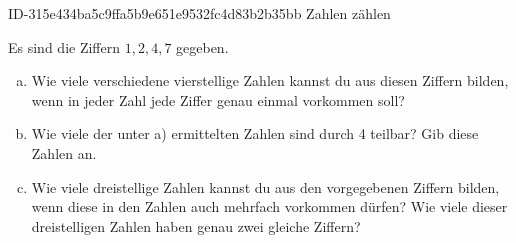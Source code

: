 \begin{exercise}
      {ID-315e434ba5c9ffa5b9e651e9532fc4d83b2b35bb}
      {Zahlen zählen}
  \ifproblem\problem\par
    Es sind die Ziffern $1,2,4,7$ gegeben.
    \begin{enumerate}[a)]
      \item Wie viele verschiedene vierstellige Zahlen kannst du aus diesen
            Ziffern bilden, wenn in jeder Zahl jede Ziffer genau einmal vorkommen
            soll?
      \item Wie viele der unter a) ermittelten Zahlen sind durch 4 teilbar?
            Gib diese Zahlen an.
      \item Wie viele dreistellige Zahlen kannst du aus den vorgegebenen Ziffern
            bilden, wenn diese in den Zahlen auch mehrfach vorkommen dürfen? Wie
            viele dieser dreistelligen Zahlen haben genau zwei gleiche Ziffern?
    \end{enumerate}
  \fi
\end{exercise}
